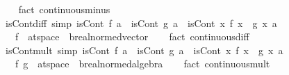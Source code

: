 \begin{isabellebody}
%
\isadelimproof
\ \ %
\endisadelimproof
%
\isatagproof
{}\isamarkupfalse%
\ {\isacharparenleft}{\kern0pt}fact\ continuous{\isacharunderscore}{\kern0pt}minus{\isacharparenright}{\kern0pt}%
\endisatagproof
{\isafoldproof}%
%
\isadelimproof
\isanewline
%
\endisadelimproof
\isanewline
{}\isamarkupfalse%
\ isCont{\isacharunderscore}{\kern0pt}diff\ {\isacharbrackleft}{\kern0pt}simp{\isacharbrackright}{\kern0pt}{\isacharcolon}{\kern0pt}\ {\isachardoublequoteopen}isCont\ f\ a\ {\isasymLongrightarrow}\ isCont\ g\ a\ {\isasymLongrightarrow}\ isCont\ {\isacharparenleft}{\kern0pt}{\isasymlambda}x{\isachardot}{\kern0pt}\ f\ x\ {\isacharminus}{\kern0pt}\ g\ x{\isacharparenright}{\kern0pt}\ a{\isachardoublequoteclose}\isanewline
\ \ \ f\ {\isacharcolon}{\kern0pt}{\isacharcolon}{\kern0pt}\ {\isachardoublequoteopen}{\isacharprime}{\kern0pt}a{\isacharcolon}{\kern0pt}{\isacharcolon}{\kern0pt}t{}{\isacharunderscore}{\kern0pt}space\ {\isasymRightarrow}\ {\isacharprime}{\kern0pt}b{\isacharcolon}{\kern0pt}{\isacharcolon}{\kern0pt}real{\isacharunderscore}{\kern0pt}normed{\isacharunderscore}{\kern0pt}vector{\isachardoublequoteclose}\isanewline
%
\isadelimproof
\ \ %
\endisadelimproof
%
\isatagproof
{}\isamarkupfalse%
\ {\isacharparenleft}{\kern0pt}fact\ continuous{\isacharunderscore}{\kern0pt}diff{\isacharparenright}{\kern0pt}%
\endisatagproof
{\isafoldproof}%
%
\isadelimproof
\isanewline
%
\endisadelimproof
\isanewline
{}\isamarkupfalse%
\ isCont{\isacharunderscore}{\kern0pt}mult\ {\isacharbrackleft}{\kern0pt}simp{\isacharbrackright}{\kern0pt}{\isacharcolon}{\kern0pt}\ {\isachardoublequoteopen}isCont\ f\ a\ {\isasymLongrightarrow}\ isCont\ g\ a\ {\isasymLongrightarrow}\ isCont\ {\isacharparenleft}{\kern0pt}{\isasymlambda}x{\isachardot}{\kern0pt}\ f\ x\ {\isacharasterisk}{\kern0pt}\ g\ x{\isacharparenright}{\kern0pt}\ a{\isachardoublequoteclose}\isanewline
\ \ \ f\ g\ {\isacharcolon}{\kern0pt}{\isacharcolon}{\kern0pt}\ {\isachardoublequoteopen}{\isacharprime}{\kern0pt}a{\isacharcolon}{\kern0pt}{\isacharcolon}{\kern0pt}t{}{\isacharunderscore}{\kern0pt}space\ {\isasymRightarrow}\ {\isacharprime}{\kern0pt}b{\isacharcolon}{\kern0pt}{\isacharcolon}{\kern0pt}real{\isacharunderscore}{\kern0pt}normed{\isacharunderscore}{\kern0pt}algebra{\isachardoublequoteclose}\isanewline
%
\isadelimproof
\ \ %
\endisadelimproof
%
\isatagproof
{}\isamarkupfalse%
\ {\isacharparenleft}{\kern0pt}fact\ continuous{\isacharunderscore}{\kern0pt}mult{\isacharparenright}{\kern0pt}%
\endisatagproof

\end{isabellebody}
